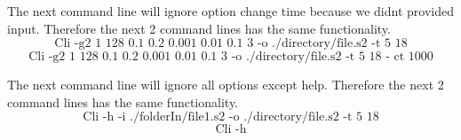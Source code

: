 \documentclass[english]{article}
\begin{document}
The next command line will ignore option change time because we didnt provided input. Therefore the next 2 command lines has the same functionality.
$$\text{Cli -g2 1 128 0.1 0.2 0.001 0.01 0.1 3 -o ./directory/file.s2 -t 5 18}$$
$$\text{Cli -g2 1 128 0.1 0.2 0.001 0.01 0.1 3 -o ./directory/file.s2 -t 5 18 - ct 1000}$$

The next command line will ignore all options except help. Therefore the next 2 command lines has the same functionality.
$$\text{Cli -h -i ./folderIn/file1.s2 -o ./directory/file.s2 -t 5 18}$$
$$\text{Cli -h}$$





%
%
%
%
%
%
\end{document}
